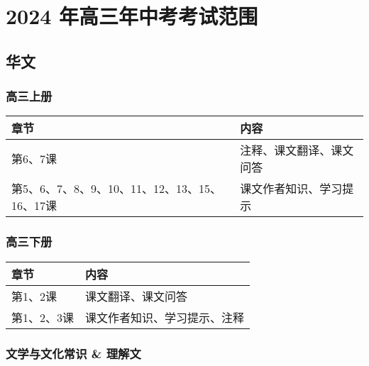 \documentclass[
]{article}
\begin{document}
\section{2024
年高三年中考考试范围}\label{2024-ux5e74ux9ad8ux4e09ux5e74ux4e2dux8003ux8003ux8bd5ux8303ux56f4}

\subsection{华文}\label{ux534eux6587}

\subsubsection{高三上册}\label{ux9ad8ux4e09ux4e0aux518c}

\begin{tabularx}{\textwidth}{lX}
\toprule
章节 & 内容 \\
\bottomrule
第6、7课 & 注释、课文翻译、课文问答 \\
\midrule
第5、6、7、8、9、10、11、12、13、15、16、17课 & 课文作者知识、学习提示 \\
\bottomrule
\end{tabularx}

\subsubsection{高三下册}\label{ux9ad8ux4e09ux4e0bux518c}

\begin{tabularx}{\textwidth}{lX}
\toprule
章节 & 内容 \\
\bottomrule
第1、2课 & 课文翻译、课文问答 \\
\midrule
第1、2、3课 & 课文作者知识、学习提示、注释 \\
\bottomrule
\end{tabularx}

\subsubsection{文学与文化常识 \&
理解文}\label{ux6587ux5b66ux4e0eux6587ux5316ux5e38ux8bc6--ux7406ux89e3ux6587}
\end{document}
